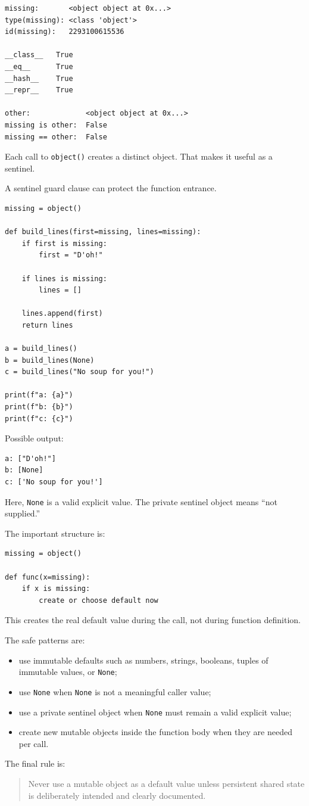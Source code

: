 \begin{verbatim}
missing:       <object object at 0x...>
type(missing): <class 'object'>
id(missing):   2293100615536

__class__   True
__eq__      True
__hash__    True
__repr__    True

other:             <object object at 0x...>
missing is other:  False
missing == other:  False
\end{verbatim}

Each call to \texttt{object()} creates a distinct object. That makes it useful as a sentinel.

A sentinel guard clause can protect the function entrance.

\begin{verbatim}
missing = object()

def build_lines(first=missing, lines=missing):
    if first is missing:
        first = "D'oh!"

    if lines is missing:
        lines = []

    lines.append(first)
    return lines

a = build_lines()
b = build_lines(None)
c = build_lines("No soup for you!")

print(f"a: {a}")
print(f"b: {b}")
print(f"c: {c}")
\end{verbatim}

Possible output:

\begin{verbatim}
a: ["D'oh!"]
b: [None]
c: ['No soup for you!']
\end{verbatim}

Here, \texttt{None} is a valid explicit value. The private sentinel object means ``not supplied.''

The important structure is:

\begin{verbatim}
missing = object()

def func(x=missing):
    if x is missing:
        create or choose default now
\end{verbatim}

This creates the real default value during the call, not during function definition.

The safe patterns are:

\begin{itemize}
    \item use immutable defaults such as numbers, strings, booleans, tuples of immutable values, or \texttt{None};
    \item use \texttt{None} when \texttt{None} is not a meaningful caller value;
    \item use a private sentinel object when \texttt{None} must remain a valid explicit value;
    \item create new mutable objects inside the function body when they are needed per call.
\end{itemize}

The final rule is:

\begin{quote}
Never use a mutable object as a default value unless persistent shared state is deliberately intended and clearly documented.
\end{quote}